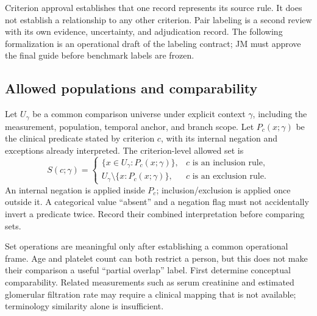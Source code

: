 \documentclass[10pt,letterpaper]{article}
\begin{document}
Criterion approval establishes that one record represents its source rule.
It does not establish a relationship to any other criterion. Pair labeling is
a second review with its own evidence, uncertainty, and adjudication record.
The following formalization is an operational draft of the labeling contract;
JM must approve the final guide before benchmark labels are frozen.

\subsection{Allowed populations and comparability}
Let $U_{\gamma}$ be a common comparison universe under explicit context
$\gamma$, including the measurement, population, temporal anchor, and branch
scope. Let $P_c(x;\gamma)$ be the clinical predicate stated by criterion $c$,
with its internal negation and exceptions already interpreted. The
criterion-level allowed set is
\[
 S(c;\gamma)=
 \begin{cases}
 \{x\in U_{\gamma}:P_c(x;\gamma)\}, & c\text{ is an inclusion rule},\\
 U_{\gamma}\setminus\{x:P_c(x;\gamma)\}, & c\text{ is an exclusion rule}.
 \end{cases}
\]
An internal negation is applied inside $P_c$; inclusion/exclusion is applied
once outside it. A categorical value ``absent'' and a negation flag must not
accidentally invert a predicate twice. Record their combined interpretation
before comparing sets.

Set operations are meaningful only after establishing a common operational
frame. Age and platelet count can both restrict a person, but this does not
make their comparison a useful ``partial overlap'' label. First determine
conceptual comparability. Related measurements such as serum creatinine and
estimated glomerular filtration rate may require a clinical mapping that is
not available; terminology similarity alone is insufficient.
\end{document}
